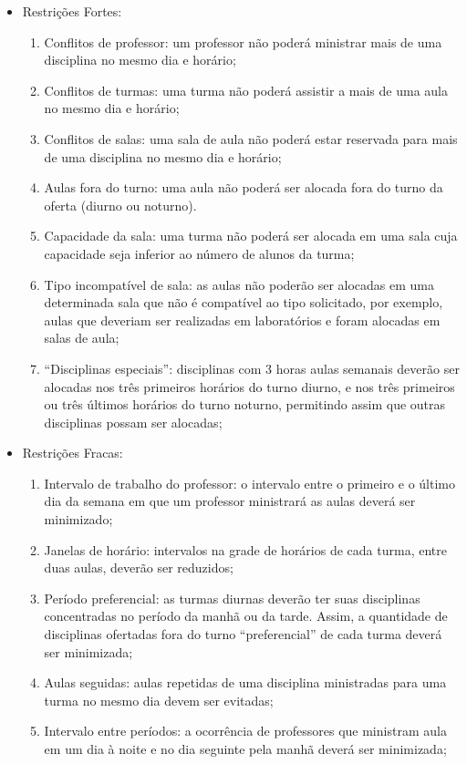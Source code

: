 \begin{itemize}
    \item Restrições Fortes:
    \begin{enumerate}
        \item Conflitos de professor: um professor não poderá ministrar mais de uma disciplina no mesmo dia e horário;
        \item Conflitos de turmas: uma turma não poderá assistir a mais de uma aula no mesmo dia e horário;
        \item Conflitos de salas: uma sala de aula não poderá estar reservada para mais de uma disciplina no mesmo dia e horário;
        \item Aulas fora do turno: uma aula não poderá ser alocada fora do turno da oferta (diurno ou noturno).
        \item Capacidade da sala: uma turma não poderá ser alocada em uma sala cuja capacidade seja inferior ao número de alunos da turma;
        \item Tipo incompatível de sala: as aulas não poderão ser alocadas em uma determinada sala que não é compatível ao tipo solicitado, por exemplo, aulas que deveriam ser realizadas em laboratórios e foram alocadas em salas de aula;
        \item “Disciplinas especiais”: disciplinas com 3 horas aulas semanais deverão ser alocadas nos três primeiros horários do turno diurno, e nos três primeiros ou três últimos horários do turno noturno, permitindo assim que outras disciplinas possam ser alocadas;
    \end{enumerate}
    \item Restrições Fracas:
    \begin{enumerate}[resume]
		\item Intervalo de trabalho do professor: o intervalo entre o primeiro e o último dia da semana em que um professor ministrará as aulas deverá ser minimizado;
		\item Janelas de horário: intervalos na grade de horários de cada turma, entre duas aulas, deverão ser reduzidos;
		\item Período preferencial: as turmas diurnas deverão ter suas disciplinas concentradas no período da manhã ou da tarde. Assim, a quantidade de disciplinas ofertadas fora do turno “preferencial” de cada turma deverá ser minimizada;
		\item Aulas seguidas: aulas repetidas de uma disciplina ministradas para uma turma no mesmo dia devem ser evitadas;
		\item Intervalo entre períodos: a ocorrência de professores que ministram aula em um dia à noite e no dia seguinte pela manhã deverá ser minimizada;

\end{enumerate}
\end{itemize}
